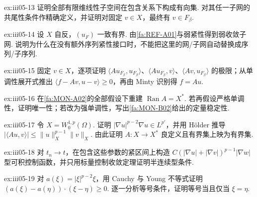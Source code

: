 \begin{FAExercise}[有向网与共尾性]{ex:iii05-13}
证明全部有限维线性子空间在包含关系下构成有向集. 对其任一子网的共尾性条件作精确定义，并证明对固定 \(\displaystyle v\in X\)，最终有 \(\displaystyle v\in F_\beta\).
\end{FAExercise}

\begin{FAExercise}[自反弱收敛子网]{ex:iii05-14}
设 \(\displaystyle X\) 自反，\(\displaystyle(u_F)\) 一致有界. 由\autoref{fa:REF-A01}与弱紧性得到弱收敛子网. 说明为什么在没有额外序列紧性接口时，不能把这里的网/子网自动替换成序列/子序列.
\end{FAExercise}

\begin{FAExercise}{ex:iii05-15}
固定 \(\displaystyle v\in X\)，逐项证明 \(\displaystyle\langle Au_{F_\beta},u_{F_\beta}\rangle\)、\(\displaystyle\langle Au_{F_\beta},v\rangle\)、\(\displaystyle\langle Av,u_{F_\beta}\rangle\) 的极限；从单调性展开式推出 \(\displaystyle\langle f-Av,u-v\rangle\geqslant0\)，再由 Minty 识别得 \(\displaystyle f=Au\).
\end{FAExercise}

\begin{FAExercise}[满射性与唯一性]{ex:iii05-16}
在\autoref{fa:MON-A02}的全部假设下重建 \(\displaystyle\operatorname{Ran}A=X^*\). 若再假设严格单调性，证明唯一性；若改为强单调性，写出\autoref{fa:MON-B02}给出的定量稳定性.
\end{FAExercise}

\begin{FAExercise}{ex:iii05-17}
令 \(\displaystyle X=W_0^{1,p}(\Omega)\). 证明 \(\displaystyle|\nabla u|^{p-2}\nabla u\in L^{p'}\)，并用 Hölder 推导 \(\displaystyle|\langle Au,v\rangle|\leqslant\|u\|_X^{p-1}\|v\|_X\). 由此证明 \(\displaystyle A:X\to X^*\) 良定义且有界集上映为有界集.
\end{FAExercise}

\begin{FAExercise}{ex:iii05-18}
对 \(\displaystyle t_n\to t\)，在包含这些参数的紧区间上构造 \(\displaystyle C(|\nabla u|+|\nabla v|)^{p-1}|\nabla w|\) 型可积控制函数，并只用标量控制收敛定理证明半连续型条件.
\end{FAExercise}

\begin{FAExercise}[逐点单调性]{ex:iii05-19}
对 \(\displaystyle a(\xi)=|\xi|^{p-2}\xi\)，用 Cauchy 与 Young 不等式证明 \(\displaystyle(a(\xi)-a(\eta))\cdot(\xi-\eta)\geqslant0\). 逐一分析等号条件，证明等号当且仅当 \(\displaystyle\xi=\eta\).
\end{FAExercise}

